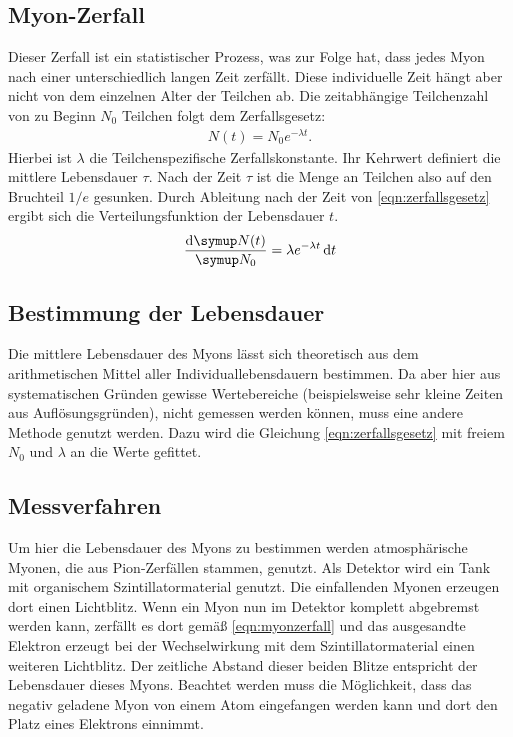 \subsection{Myon-Zerfall}

Dieser Zerfall ist ein statistischer Prozess, was zur Folge hat, dass jedes Myon nach einer unterschiedlich langen Zeit zerfällt. Diese individuelle Zeit hängt aber nicht von dem einzelnen Alter der Teilchen ab. Die zeitabhängige Teilchenzahl von zu Beginn $N_0$ Teilchen folgt dem Zerfallsgesetz:
\begin{align}
  N(t) = N_0 e^{-\lambda t}. \label{eqn:zerfallsgesetz}
\end{align}
Hierbei ist $\lambda$ die Teilchenspezifische Zerfallskonstante. Ihr Kehrwert definiert die mittlere Lebensdauer $\tau$. Nach der Zeit $\tau$ ist die Menge an Teilchen also auf den Bruchteil $1/e$ gesunken.
Durch Ableitung nach der Zeit von \eqref{eqn:zerfallsgesetz} ergibt sich die Verteilungsfunktion der Lebensdauer $t$.
\begin{align}
  \frac{\dif \g{N}(t)}{\g{N}_0} = \lambda e^{-\lambda t} \dif t \label{eqn:expverteilung}
\end{align}

\subsection{Bestimmung der Lebensdauer}
\label{sec:Lebensdauerbestimmung}
Die mittlere Lebensdauer des Myons lässt sich theoretisch aus dem arithmetischen Mittel aller Individuallebensdauern bestimmen. Da aber hier aus systematischen Gründen gewisse Wertebereiche (beispielsweise sehr kleine Zeiten aus Auflösungsgründen), nicht gemessen werden können, muss eine andere Methode genutzt werden. Dazu wird die Gleichung \eqref{eqn:zerfallsgesetz} mit freiem $N_0$ und $\lambda$ an die Werte gefittet.

\subsection{Messverfahren}
Um hier die Lebensdauer des Myons zu bestimmen werden atmosphärische Myonen, die aus Pion-Zerfällen stammen, genutzt. Als Detektor wird ein Tank mit organischem Szintillatormaterial genutzt. Die einfallenden Myonen erzeugen dort einen Lichtblitz. Wenn ein Myon nun im Detektor komplett abgebremst werden kann, zerfällt es dort gemäß \eqref{eqn:myonzerfall} und das ausgesandte Elektron erzeugt bei der Wechselwirkung mit dem Szintillatormaterial einen weiteren Lichtblitz. Der zeitliche Abstand dieser beiden Blitze entspricht der Lebensdauer dieses Myons. Beachtet werden muss die Möglichkeit, dass das negativ geladene Myon von einem Atom eingefangen werden kann und dort den Platz eines Elektrons einnimmt.
